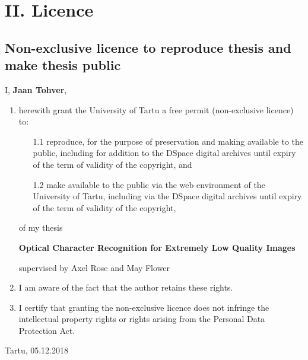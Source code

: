 \documentclass[12pt]{article}
\begin{document}
\newpage

\section*{II. Licence}


\subsection*{Non-exclusive licence to reproduce thesis and make thesis public}

I, \textbf{Jaan Tohver},

\begin{enumerate}
\item
herewith grant the University of Tartu a free permit (non-exclusive licence) to:
\begin{enumerate}
\item[1.1]
reproduce, for the purpose of preservation and making available to the public, including for addition to the DSpace digital archives until expiry of the term of validity of the copyright, and
\item[1.2]
make available to the public via the web environment of the University of Tartu, including via the DSpace digital archives until expiry of the term of validity of the copyright,
\end{enumerate}

of my thesis

\textbf{Optical Character Recognition for Extremely Low Quality Images}

supervised by Axel Rose and May Flower

\item
I am aware of the fact that the author retains these rights.
\item
I certify that granting the non-exclusive licence does not infringe the intellectual property rights or rights arising from the Personal Data Protection Act. 
\end{enumerate}

\noindent
Tartu, 05.12.2018
\end{document}
